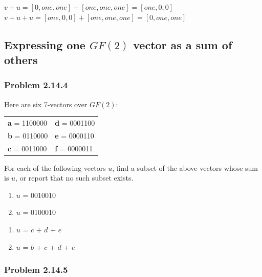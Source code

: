 \documentclass[
  letterpaper,
  DIV=11,
  numbers=noendperiod]{scrartcl}
\providecommand{\tightlist}{%
  \setlength{\itemsep}{0pt}\setlength{\parskip}{0pt}}\usepackage{longtable,booktabs,array}
\begin{document}
\(v+u = [0, one, one] + [one, one, one] = [one, 0, 0]\)\\
\(v+u+u = [one, 0, 0] + [one, one, one] = [0, one, one]\)

\hypertarget{expressing-one-gf2-vector-as-a-sum-of-others}{%
\subsection{\texorpdfstring{Expressing one \(GF(2)\) vector as a sum of
others}{Expressing one GF(2) vector as a sum of others}}\label{expressing-one-gf2-vector-as-a-sum-of-others}}

\hypertarget{problem-2.14.4}{%
\subsubsection{Problem 2.14.4}\label{problem-2.14.4}}

Here are six 7-vectors over \(GF(2)\):

\begin{longtable}[]{@{}ll@{}}
\toprule()
\endhead
\textbf{a} = 1100000 & \textbf{d} = 0001100 \\
\textbf{b} = 0110000 & \textbf{e} = 0000110 \\
\textbf{c} = 0011000 & \textbf{f} = 0000011 \\
\bottomrule()
\end{longtable}

For each of the following vectors \(u\), find a subset of the above
vectors whose sum is \(u\), or report that no such subset exists.

\begin{enumerate}
\def\labelenumi{\arabic{enumi}.}
\tightlist
\item
  \(u\) = 0010010\\
\item
  \(u\) = 0100010\\
\end{enumerate}

\begin{enumerate}
\def\labelenumi{\arabic{enumi})}
\tightlist
\item
  \(u\) = \(c\) + \(d\) + \(e\)\\
\item
  \(u\) = \(b\) + \(c\) + \(d\) + \(e\)
\end{enumerate}

\hypertarget{problem-2.14.5}{%
\subsubsection{Problem 2.14.5}\label{problem-2.14.5}}
\end{document}
